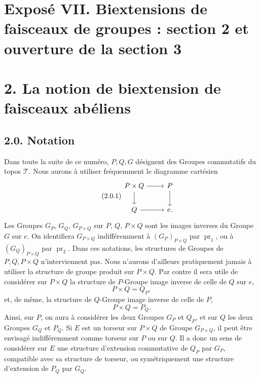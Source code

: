 \documentclass[11pt]{article}
\providecommand{\pr}{\operatorname{pr}}
\providecommand{\id}{\operatorname{id}}
\begin{document}
\providecommand{\BIEXT}{\operatorname{BIEXT}}
\providecommand{\Biext}{\operatorname{Biext}}
\providecommand{\GRAB}{\operatorname{GRAB}}
\providecommand{\TORSBIRIG}{\operatorname{TORSBIRIG}}
\providecommand{\Corr}{\operatorname{Corr}}
\providecommand{\sym}{\mathrm{sym}}
\providecommand{\id}{\mathrm{id}}
\providecommand{\cY}{\mathcal Y}
\providecommand{\cC}{\mathcal C}
\providecommand{\e}{\mathrm e}

\section*{Exposé VII. Biextensions de faisceaux de groupes : section 2 et ouverture de la section 3}

\section*{2. La notion de biextension de faisceaux abéliens}

\subsection*{2.0. Notation}
Dans toute la suite de ce numéro, \(P,Q,G\) désignent des Groupes commutatifs du topos \(\mathcal T\).  Nous aurons à utiliser fréquemment le diagramme cartésien
\begin{equation}\tag{2.0.1}
\begin{tikzcd}
P\times Q \arrow[r] \arrow[d] & P\arrow[d]\\
Q\arrow[r] & e .
\end{tikzcd}
\end{equation}
Les Groupes \(G_P\), \(G_Q\), \(G_{P\times Q}\) sur \(P\), \(Q\), \(P\times Q\) sont les images inverses du Groupe \(G\) sur \(e\).  On identifiera \(G_{P\times Q}\) indifféremment à \((G_P)_{P\times Q}\) par \(\pr_1\), ou à \((G_Q)_{P\times Q}\) par \(\pr_2\).  Dans ces notations, les structures de Groupes de \(P,Q,P\times Q\) n'interviennent pas.  Nous n'aurons d'ailleurs pratiquement jamais à utiliser la structure de groupe produit sur \(P\times Q\).  Par contre il sera utile de considérer sur \(P\times Q\) la structure de \(P\)-Groupe image inverse de celle de \(Q\) sur \(e\),
\begin{equation}\tag{2.0.2}
  P\times Q=Q_P,
\end{equation}
et, de même, la structure de \(Q\)-Groupe image inverse de celle de \(P\),
\begin{equation}\tag{2.0.3}
  P\times Q=P_Q.
\end{equation}
Ainsi, sur \(P\), on aura à considérer les deux Groupes \(G_P\) et \(Q_P\), et sur \(Q\) les deux Groupes \(G_Q\) et \(P_Q\).  Si \(E\) est un torseur sur \(P\times Q\) de Groupe \(G_{P\times Q}\), il peut être envisagé indifféremment comme torseur sur \(P\) ou sur \(Q\).  Il a donc un sens de considérer sur \(E\) une structure d'extension commutative de \(Q_P\) par \(G_P\), compatible avec sa structure de torseur, ou symétriquement une structure d'extension de \(P_Q\) par \(G_Q\).
\end{document}
